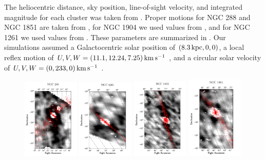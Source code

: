 \documentclass[twocolumn]{aastex61}
\begin{document}
The heliocentric distance, sky position, line-of-sight velocity, and integrated magnitude for each cluster was taken from \citet[updated 2010][]{Harris:1996}.
Proper motions for NGC 288 and NGC 1851 are taken from \citet{Dinescu:1997}, for NGC 1904 we used values from \citet{Dinescu:1999}, and for NGC 1261 we used values from \citet{Dambis:2006}.
These parameters are summarized in .
Our simulations assumed a Galactocentric solar position of $(8.3\mathrm{\,kpc}, 0, 0)$, a local reflex motion of $U,V,W = (11.1, 12.24, 7.25) \mathrm{\,km} \mathrm{\,s}^{-1}$ \citep{Schonrich:2010}, and a circular solar velocity of $U,V,W = (0, 233, 0) \mathrm{\,km} \mathrm{\,s}^{-1}$ \citep{Kuepper:2015}.

\begin{figure}[t]
\centering
  \includegraphics[width=0.24\textwidth]{ngc288_density.pdf}
  \includegraphics[width=0.24\textwidth]{ngc1261_density.pdf}
  \includegraphics[width=0.24\textwidth]{ngc1851_density.pdf}
  \includegraphics[width=0.24\textwidth]{ngc1904_density.pdf}

\end{figure}
\end{document}
